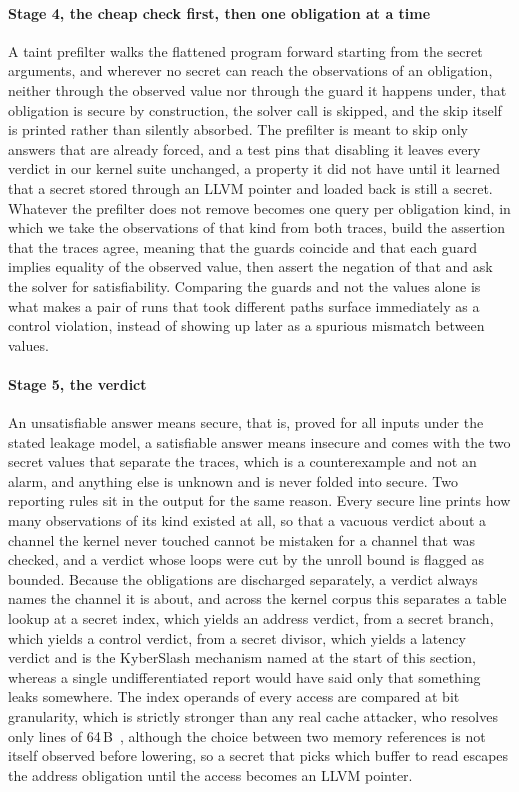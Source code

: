 \paragraph{Stage 4, the cheap check first, then one obligation at a time}
A taint prefilter walks the flattened program forward starting from the secret arguments, and wherever no secret can reach the observations of an obligation, neither through the observed value nor through the guard it happens under, that obligation is secure by construction, the solver call is skipped, and the skip itself is printed rather than silently absorbed.
The prefilter is meant to skip only answers that are already forced, and a test pins that disabling it leaves every verdict in our kernel suite unchanged, a property it did not have until it learned that a secret stored through an LLVM pointer and loaded back is still a secret.
Whatever the prefilter does not remove becomes one query per obligation kind, in which we take the observations of that kind from both traces, build the assertion that the traces agree, meaning that the guards coincide and that each guard implies equality of the observed value, then assert the negation of that and ask the solver for satisfiability.
Comparing the guards and not the values alone is what makes a pair of runs that took different paths surface immediately as a control violation, instead of showing up later as a spurious mismatch between values.
\paragraph{Stage 5, the verdict}
An unsatisfiable answer means secure, that is, proved for all inputs under the stated leakage model, a satisfiable answer means insecure and comes with the two secret values that separate the traces, which is a counterexample and not an alarm, and anything else is unknown and is never folded into secure.
Two reporting rules sit in the output for the same reason.
Every secure line prints how many observations of its kind existed at all, so that a vacuous verdict about a channel the kernel never touched cannot be mistaken for a channel that was checked, and a verdict whose loops were cut by the unroll bound is flagged as bounded.
Because the obligations are discharged separately, a verdict always names the channel it is about, and across the kernel corpus this separates a table lookup at a secret index, which yields an address verdict, from a secret branch, which yields a control verdict, from a secret divisor, which yields a latency verdict and is the KyberSlash mechanism named at the start of this section, whereas a single undifferentiated report would have said only that something leaks somewhere.
The index operands of every access are compared at bit granularity, which is strictly stronger than any real cache attacker, who resolves only lines of 64\,B~\cite{yarom2014flushreload}, although the choice between two memory references is not itself observed before lowering, so a secret that picks which buffer to read escapes the address obligation until the access becomes an LLVM pointer.

